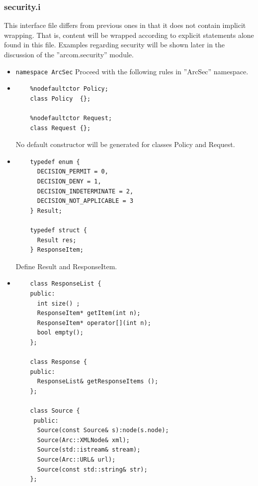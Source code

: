 \documentclass{article}
\begin{document}
\subsubsection{security.i}
This interface file differs from previous ones in that it does not contain implicit wrapping. 
That is, content will be wrapped according to explicit statements alone found in this file.
Examples regarding security will be shown later in the discussion of the ''arcom.security'' module.
\begin{flushleft}
\begin{itemize}
  \item{\verb$namespace ArcSec$} \linebreak
  Proceed with the following rules in ''ArcSec'' namespace.
\end{itemize}
\begin{itemize}
  \item{ \begin{verbatim}
    %nodefaultctor Policy;
    class Policy  {};
    
    %nodefaultctor Request;
    class Request {};
  \end{verbatim}
  No default constructor will be generated for classes Policy and Request.
  }
\end{itemize}
\begin{itemize}
  \item{ \begin{verbatim}
    typedef enum {
      DECISION_PERMIT = 0,
      DECISION_DENY = 1,
      DECISION_INDETERMINATE = 2,
      DECISION_NOT_APPLICABLE = 3
    } Result;
   
    typedef struct {
      Result res;
    } ResponseItem;
  \end{verbatim}
  }
  Define Result and ResponseItem.
\end{itemize}
\begin{itemize}
  \item{ \begin{verbatim}
    class ResponseList {
    public:
      int size() ;
      ResponseItem* getItem(int n);
      ResponseItem* operator[](int n);
      bool empty();
    };
    
    class Response {
    public:
      ResponseList& getResponseItems ();
    };
   
    class Source {
     public:
      Source(const Source& s):node(s.node);
      Source(Arc::XMLNode& xml);
      Source(std::istream& stream);
      Source(Arc::URL& url);
      Source(const std::string& str);
    };


\end{verbatim}}
\end{itemize}
\end{flushleft}
\end{document}
